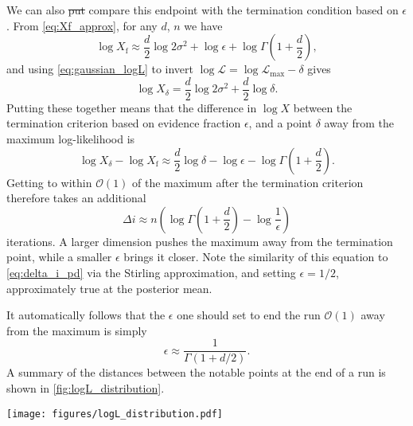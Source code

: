 \documentclass[usenatbib]{mnras}
\newcommand{\Like}{\mathcal{L}}
\newcommand{\logLmax}{\log \Like_\mathrm{max}}
\providecommand{\DIFdeltex}[1]{{\protect\color{red}\sout{#1}}}                      %
\providecommand{\DIFdelbegin}{} %
\providecommand{\DIFdelend}{} %
\providecommand{\DIFdel}[1]{\texorpdfstring{\DIFdeltex{#1}}{}} %
\newcommand{\DIFscaledelfig}{0.5}
\newlength{\DIFdelgraphicswidth} %
\newlength{\DIFdelgraphicsheight} %
\newcommand{\DIFdelincludegraphics}[2][]{%
\sbox{\DIFdelgraphicsbox}{\DIFOincludegraphics[#1]{#2}}%
\settoboxwidth{\DIFdelgraphicswidth}{\DIFdelgraphicsbox} %
\settoboxtotalheight{\DIFdelgraphicsheight}{\DIFdelgraphicsbox} %
\scalebox{\DIFscaledelfig}{%
\parbox[b]{\DIFdelgraphicswidth}{\usebox{\DIFdelgraphicsbox}\\[-\baselineskip] \rule{\DIFdelgraphicswidth}{0em}}\llap{\resizebox{\DIFdelgraphicswidth}{\DIFdelgraphicsheight}{%
\setlength{\unitlength}{\DIFdelgraphicswidth}%
\begin{picture}(1,1)%
\thicklines\linethickness{2pt} %
{\color[rgb]{1,0,0}\put(0,0){\framebox(1,1){}}}%
{\color[rgb]{1,0,0}\put(0,0){\line( 1,1){1}}}%
{\color[rgb]{1,0,0}\put(0,1){\line(1,-1){1}}}%
\end{picture}%
}\hspace*{3pt}}} %
} %
\DeclareRobustCommand{\DIFdelbegin}{\DIFOdelbegin \let\includegraphics\DIFdelincludegraphics} %
\DeclareRobustCommand{\DIFdelend}{\DIFOaddend \let\includegraphics\DIFOincludegraphics} %
\begin{document}
\par
We can also \DIFdelbegin \DIFdel{put }\DIFdelend compare this endpoint with the termination condition based on $\epsilon$. From \cref{eq:Xf_approx}, for any $d$, $n$ we have
\begin{equation}
    \log X_\mathrm{f} \approx \frac{d}{2}\log 2\sigma^2 + \log\epsilon + \log\Gamma\left(1+\frac{d}{2}\right),
\end{equation}
and using \cref{eq:gaussian_logL} to invert $\log\Like = \logLmax-\delta$ gives
\begin{equation}
    \log X_\delta=\frac{d}{2}\log 2\sigma^2+\frac{d}{2}\log\delta.
\end{equation}
Putting these together means that the difference in $\log X$ between the termination criterion based on evidence fraction $\epsilon$, and a point $\delta$ away from the maximum log-likelihood is
\begin{equation}
    \log X_\delta - \log X_\mathrm{f} \approx \frac{d}{2}\log\delta - \log\epsilon - \log\Gamma\left(1+\frac{d}{2}\right).
\end{equation}
Getting to within $\mathcal{O}(1)$ of the maximum after the termination criterion therefore takes an additional
 \begin{equation}
     \Delta i \approx n \left(\log\Gamma\left(1+\frac{d}{2}\right) - \log\frac{1}{\epsilon}\right)
\end{equation}
iterations. A larger dimension pushes the maximum away from the termination point, while a smaller $\epsilon$ brings it closer. Note the similarity of this equation to \cref{eq:delta_i_pd} via the Stirling approximation, and setting $\epsilon = 1/2$, approximately true at the posterior mean. 
\par
It automatically follows that the $\epsilon$ one should set to end the run $\mathcal{O}(1)$ away from the maximum is simply
\begin{equation}
    \boxed{\epsilon \approx \frac{1}{\Gamma\left(1 + d/2\right)}}.
\end{equation}
A summary of the distances between the notable points at the end of a run is shown in \cref{fig:logL_distribution}.

\begin{figure*}
\begin{center}
    \texttt{[image: figures/logL\_distribution.pdf]}
\end{center}
\caption{Distribution of samples as a function of $\log\mathcal{L}$, showing the posterior $\mathcal{P}(\log\mathcal{L})$, the distribution of the live points $\mathcal{\pi}(\log\mathcal{L} \mid \mathcal{L}>\mathcal{L}_i)$, and the distribution of the maximum likelihood live point $P(\log\mathcal{L}_\mathrm{max}^\mathrm{live})$. The distances are shown between these locations at the end of the run, the key takeaway being that in high dimensions the highest log-likelihood point of a nested sampling run is nowhere near the maximum in high dimensions.}
\label{fig:logL_distribution}
\end{figure*}
\end{document}
